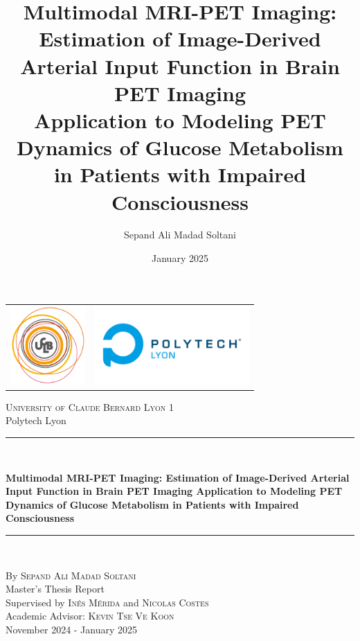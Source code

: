 \documentclass[a4paper,12pt,twoside,english,openany]{book}
[a4paper,12pt,twoside]
\title{Multimodal MRI-PET Imaging: Estimation of Image-Derived Arterial Input Function in Brain PET Imaging \\ Application to Modeling PET Dynamics of Glucose Metabolism in Patients with Impaired Consciousness}
\author{Sepand Ali Madad Soltani}
\date{January 2025}
\begin{document}
\begin{titlepage}
	\begin{center}
		\begin{tabular}{c@{\hskip 7cm}c@{\hskip 1cm}}
			\includegraphics[height=3cm]{res/ucbl.png} &
			\includegraphics[height=3cm]{res/polytech.png}
		\end{tabular}
	\end{center}

	\begin{center}

		\vspace*{.03\textheight}
		\textsc{\Large University of Claude Bernard Lyon 1 }\\[0.2cm]
		\large Polytech Lyon

		\rule{\textwidth}{0.8pt} \\
		\vspace{10pt}

		{\Large \bfseries Multimodal MRI-PET Imaging:
			Estimation of Image-Derived Arterial Input Function in Brain PET Imaging
			Application to Modeling PET Dynamics of Glucose Metabolism in Patients with Impaired Consciousness
		}
		\rule{\textwidth}{0.8pt} \\

	\end{center}

	\vfill
	\begin{center}
		By \textsc{\Large Sepand Ali Madad Soltani}\\[1cm]
		Master's Thesis Report\\[1.2cm]
		Supervised by \textsc{\large Inés Mérida}
		and
		\textsc{\large Nicolas Costes}  \\[0.2cm]
		Academic Advisor: \textsc{\large Kevin Tse Ve Koon}\\[0.2cm]
		November 2024 - January 2025

	\end{center}

	\vspace{1cm}
\end{titlepage}
\end{document}
